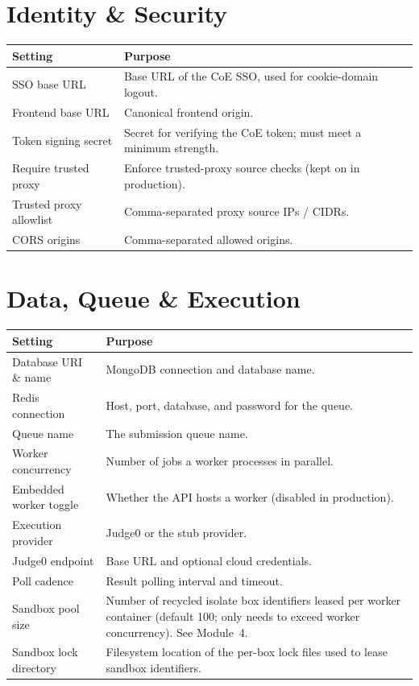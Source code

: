 \documentclass[12pt,a4paper,oneside]{report}
\begin{document}
\section{Identity \& Security}
\begin{xltabular}{\linewidth}{@{}l X@{}}
\toprule
\textbf{Setting} & \textbf{Purpose}\\
\midrule
\endhead
SSO base URL & Base URL of the CoE SSO, used for cookie-domain logout.\\
Frontend base URL & Canonical frontend origin.\\
Token signing secret & Secret for verifying the CoE token; must meet a minimum strength.\\
Require trusted proxy & Enforce trusted-proxy source checks (kept on in production).\\
Trusted proxy allowlist & Comma-separated proxy source IPs / CIDRs.\\
CORS origins & Comma-separated allowed origins.\\
\bottomrule
\end{xltabular}

\section{Data, Queue \& Execution}
\begin{xltabular}{\linewidth}{@{}l X@{}}
\toprule
\textbf{Setting} & \textbf{Purpose}\\
\midrule
\endhead
Database URI \& name & MongoDB connection and database name.\\
Redis connection & Host, port, database, and password for the queue.\\
Queue name & The submission queue name.\\
Worker concurrency & Number of jobs a worker processes in parallel.\\
Embedded worker toggle & Whether the API hosts a worker (disabled in production).\\
Execution provider & Judge0 or the stub provider.\\
Judge0 endpoint & Base URL and optional cloud credentials.\\
Poll cadence & Result polling interval and timeout.\\
Sandbox pool size & Number of recycled isolate box identifiers leased per worker container (default 100; only needs to exceed worker concurrency). See Module~4.\\
Sandbox lock directory & Filesystem location of the per-box lock files used to lease sandbox identifiers.\\
\bottomrule
\end{xltabular}
\end{document}
